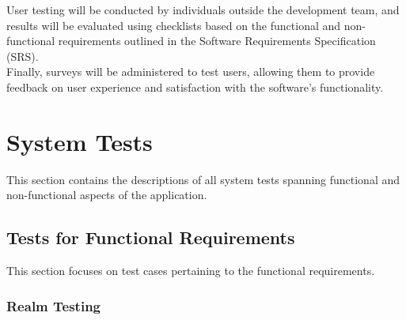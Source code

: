 \documentclass[12pt, titlepage]{article}
\begin{document}
User testing will be conducted by individuals outside the development team, and results will be evaluated using checklists based on the functional and non-functional requirements outlined in the Software Requirements Specification (SRS). \\

Finally, surveys will be administered to test users, allowing them to provide feedback on user experience and satisfaction with the software's functionality. \\

\section{System Tests}
This section contains the descriptions of all system tests spanning functional and non-functional aspects of the application.

\subsection{Tests for Functional Requirements}
This section focuses on test cases pertaining to the functional requirements.

\subsubsection{Realm Testing}
\end{document}
